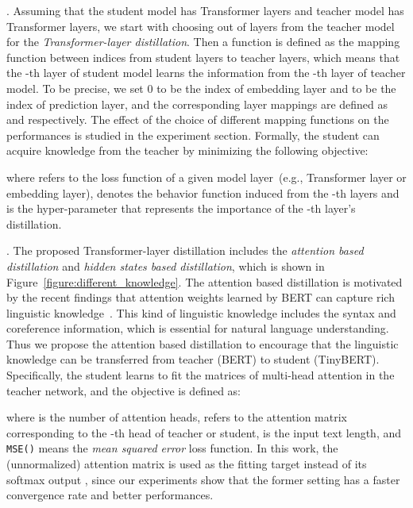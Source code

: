 \documentclass[11pt,a4paper]{article}
\newcommand{\comments}[1]{}
\begin{document}
. Assuming that the student model has  Transformer layers and teacher model has  Transformer layers, we start with choosing  out of  layers from the teacher model for the {\it Transformer-layer distillation}. Then a function  is defined as the mapping function between indices from student layers to teacher layers, which means that the -th layer of student model learns the information from the -th layer of teacher model. To be precise, we set 0 to be the index of embedding layer and  to be the index of prediction layer, and the corresponding layer mappings are defined as  and  respectively. The effect of the choice of different mapping functions on the performances is studied in the experiment section. Formally, the student can acquire knowledge from the teacher by minimizing the following objective:

where  refers to the loss function of a given model layer~(e.g., Transformer layer or embedding layer),  denotes the behavior function induced from the -th layers and  is the hyper-parameter that represents the importance of the -th layer's distillation. 


. The proposed Transformer-layer distillation includes the {\it attention based distillation} and {\it hidden states based distillation}, which is shown in Figure~\ref{figure:different_knowledge}. The attention based distillation is motivated by the recent findings that attention weights learned by BERT can capture rich linguistic knowledge~\cite{clark2019does}. This kind of linguistic knowledge includes the syntax and coreference information, which is essential for natural language understanding. Thus we propose the attention based distillation to encourage that the linguistic knowledge can be transferred from teacher (BERT) to student (TinyBERT). Specifically, the student learns to fit the matrices of multi-head attention in the teacher network, and the objective is defined as:

where  is the number of attention heads,  refers to the attention matrix corresponding to the -th head of teacher or student,  is the input text length, and {\tt MSE()} means the {\it mean squared error} loss function. In this work, the (unnormalized) attention matrix  is used as the fitting target instead of its softmax output , since our experiments show that the former setting has a faster convergence rate and better performances. 

\comments{In this work, we use logits that is argument of the softmax function instead of softmax weight, as the fitting target. Because the experiments show that the logits fitting has faster convergence and better performances than the weight fitting. }
\end{document}
